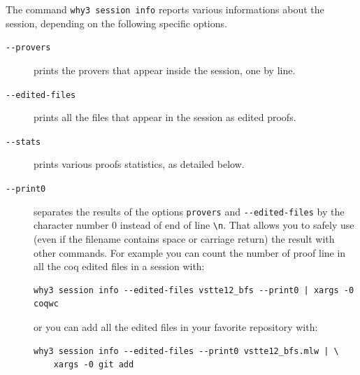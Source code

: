 The command \texttt{why3 session info} reports various informations
about the session, depending on the following specific options.
\begin{description}
\item[\texttt{-{}-provers}] prints the provers that appear inside
  the session, one by line.
\item[\texttt{-{}-edited-files}] prints all the files that appear in
  the session as edited proofs.
\item[\texttt{-{}-stats}] prints various proofs statistics, as
  detailed below.
\item[\texttt{-{}-print0}] separates the results of the options
  \verb|provers| and \verb|--edited-files| by the character number 0
  instead of end of line \verb|\n|. That allows you to safely use
  (even if the filename contains space or carriage return) the result
  with other commands. For example you can count the number of proof
  line in all the coq edited files in a session with:
\begin{verbatim}
why3 session info --edited-files vstte12_bfs --print0 | xargs -0 coqwc
\end{verbatim}
  or you can add all the edited files in your favorite repository
  with:
\begin{verbatim}
why3 session info --edited-files --print0 vstte12_bfs.mlw | \
    xargs -0 git add
\end{verbatim}

\end{description}





